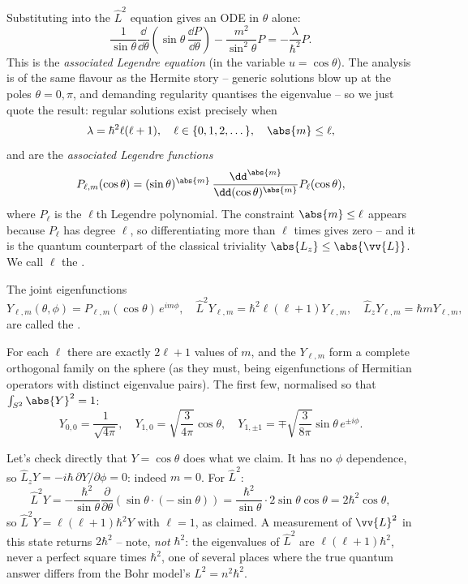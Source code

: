 Substituting into the $\hat{L}^2$ equation gives an ODE in $\theta$ alone:
$$
\frac{1}{\sin \theta} \frac{\dd}{\dd \theta}\left( \sin \theta \, \frac{\dd P}{\dd \theta} \right) - \frac{m^2}{\sin^2 \theta} P = -\frac{\lambda}{\hbar^2} P.
$$
This is the \emph{associated Legendre equation} (in the variable $u = \cos\theta$). The analysis is of the same flavour as the Hermite story -- generic solutions blow up at the poles $\theta = 0, \pi$, and demanding regularity quantises the eigenvalue -- so we just quote the result: regular solutions exist precisely when
$$
\lambda = \hbar^2 \ell(\ell + 1), \quad \ell \in \{0, 1, 2, \dots\}, \quad \abs{m} \leq \ell,
$$
and are the \emph{associated Legendre functions}
$$
P_{\ell, m}(\cos \theta) = (\sin \theta)^{\abs{m}} \, \frac{\dd^{\abs{m}}}{\dd (\cos\theta)^{\abs{m}}} P_\ell(\cos \theta),
$$
where $P_\ell$ is the $\ell$th Legendre polynomial. The constraint $\abs{m} \leq \ell$ appears because $P_\ell$ has degree $\ell$, so differentiating more than $\ell$ times gives zero -- and it is the quantum counterpart of the classical triviality $\abs{L_z} \leq \abs{\vv{L}}$. We call $\ell$ the .

\begin{definition}
    The joint eigenfunctions
    $$
    Y_{\ell, m}(\theta, \phi) = P_{\ell, m}(\cos\theta) \, e^{i m \phi}, \quad \hat{L}^2 Y_{\ell,m} = \hbar^2 \ell(\ell+1) Y_{\ell, m}, \quad \hat{L}_z Y_{\ell, m} = \hbar m Y_{\ell, m},
    $$
    are called the .
\end{definition}

For each $\ell$ there are exactly $2\ell + 1$ values of $m$, and the $Y_{\ell,m}$ form a complete orthogonal family on the sphere (as they must, being eigenfunctions of Hermitian operators with distinct eigenvalue pairs). The first few, normalised so that $\int_{S^2} \abs{Y}^2 = 1$:
$$
Y_{0,0} = \frac{1}{\sqrt{4\pi}}, \quad
Y_{1,0} = \sqrt{\frac{3}{4 \pi}} \cos \theta, \quad
Y_{1, \pm 1} = \mp \sqrt{\frac{3}{8\pi}} \sin\theta \, e^{\pm i \phi}.
$$
\begin{example}[Verifying $Y_{1,0}$]
    Let's check directly that $Y = \cos\theta$ does what we claim. It has no $\phi$ dependence, so $\hat{L}_z Y = -i\hbar \, \partial Y/\partial\phi = 0$: indeed $m = 0$. For $\hat{L}^2$:
    $$
    \hat{L}^2 Y = -\frac{\hbar^2}{\sin\theta}\frac{\partial}{\partial \theta}\left( \sin\theta \cdot (-\sin\theta) \right)
    = \frac{\hbar^2}{\sin \theta} \cdot 2 \sin\theta\cos\theta = 2 \hbar^2 \cos \theta,
    $$
    so $\hat{L}^2 Y = \ell(\ell+1)\hbar^2 Y$ with $\ell = 1$, as claimed. A measurement of $\vv{L}^2$ in this state returns $2\hbar^2$ -- note, \emph{not} $\hbar^2$: the eigenvalues of $\hat{L}^2$ are $\ell(\ell+1)\hbar^2$, never a perfect square times $\hbar^2$, one of several places where the true quantum answer differs from the Bohr model's $L^2 = n^2 \hbar^2$.
\end{example}

